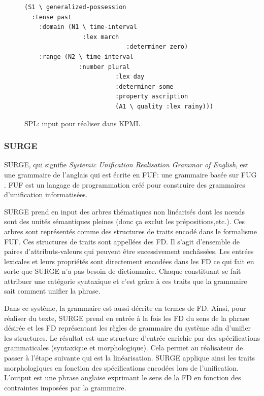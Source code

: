 \begin{figure}[htb]
\caption{SPL: input pour réaliser  dans KPML}
\label{kpml}
\begin{lstlisting}[language=mate]
(S1 \ generalized-possession
  :tense past 
	:domain (N1 \ time-interval
	            :lex march
							:determiner zero)
	:range (N2 \ time-interval
	           :number plural
						 :lex day
						 :determiner some
						 :property ascription
						 (A1 \ quality :lex rainy)))
\end{lstlisting}
\end{figure}

\subsubsection{SURGE}
SURGE, qui signifie \emph{Systemic Unification Realisation Grammar of English}, est une grammaire de l'anglais \citep{Elhadad98surge:a} qui est écrite en \ac{FUF}: une grammaire basée sur \acf{FUG} \citep{KayFunctionalUnificationGrammar1984}. \ac{FUF} est un langage de programmation créé pour construire des grammaires d'unification informatisées.

SURGE prend en input des arbres thématiques non linéarisés dont les n\oe{}uds sont des unités sémantiques pleines (donc ça exclut les prépositions,etc.). Ces arbres sont représentés comme des structures de traits encodé dans le formalisme \ac{FUF}. Ces structures de traits sont appellées des \ac{FD}. Il s'agit d'ensemble de paires d'attributs-valeurs qui peuvent être sucessivement enchâssées. Les entrées lexicales et leurs propriétés sont directement encodées dans les \ac{FD} ce qui fait en sorte que SURGE n'a pas besoin de dictionnaire. Chaque constituant se fait attribuer une catégorie syntaxique et c'est grâce à ces traits que la grammaire sait comment unifier la phrase.

Dans ce système, la grammaire est aussi décrite en termes de \ac{FD}. Ainsi, pour réaliser du texte, SURGE prend en entrée à la fois les \ac{FD} du sens de la phrase désirée et les \ac{FD} représentant les règles de grammaire du système afin d'unifier les structures. Le résultat est une structure d'entrée enrichie par des spécifications grammaticales (syntaxique et morphologique). Cela permet au réalisateur de passer à l'étape suivante qui est la linéarisation. SURGE applique ainsi les traits morphologiques en fonction des spécifications encodées lors de l'unification. L'output est une phrase anglaise exprimant le sens de la \ac{FD} en fonction des contraintes imposées par la grammaire.

